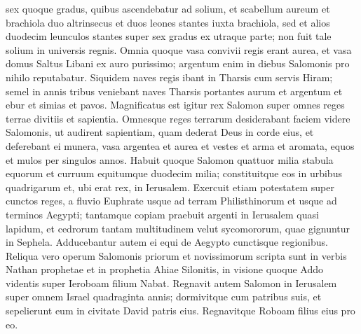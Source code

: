 \begin{biblechapter}
\verse sex quoque gradus, quibus ascendebatur ad solium, et scabellum aureum et brachiola duo altrinsecus et duos leones stantes iuxta brachiola, 
\verse sed et alios duodecim leunculos stantes super sex gradus ex utraque parte; non fuit tale solium in universis regnis. 
\verse Omnia quoque vasa convivii regis erant aurea, et vasa domus Saltus Libani ex auro purissimo; argentum enim in diebus Salomonis pro nihilo reputabatur. 
\verse Siquidem naves regis ibant in Tharsis cum servis Hiram; semel in annis tribus veniebant naves Tharsis portantes aurum et argentum et ebur et simias et pavos. 
\verse Magnificatus est igitur rex Salomon super omnes reges terrae divitiis et sapientia. 
\verse Omnesque reges terrarum desiderabant faciem videre Salomonis, ut audirent sapientiam, quam dederat Deus in corde eius, 
\verse et deferebant ei munera, vasa argentea et aurea et vestes et arma et aromata, equos et mulos per singulos annos. 
\verse Habuit quoque Salomon quattuor milia stabula equorum et curruum equitumque duodecim milia; constituitque eos in urbibus quadrigarum et, ubi erat rex, in Ierusalem. 
\verse Exercuit etiam potestatem super cunctos reges, a fluvio Euphrate usque ad terram Philisthinorum et usque ad terminos Aegypti; 
\verse tantamque copiam praebuit argenti in Ierusalem quasi lapidum, et cedrorum tantam multitudinem velut sycomororum, quae gignuntur in Sephela.  
\verse Adducebantur autem ei equi de Aegypto cunctisque regionibus. 
\verse Reliqua vero operum Salomonis priorum et novissimorum scripta sunt in verbis Nathan prophetae et in prophetia Ahiae Silonitis, in visione quoque Addo videntis super Ieroboam filium Nabat. 
\verse Regnavit autem Salomon in Ierusalem super omnem Israel quadraginta annis;  
\verse dormivitque cum patribus suis, et sepelierunt eum in civitate David patris eius. Regnavitque Roboam filius eius pro eo. 
\end{biblechapter}


